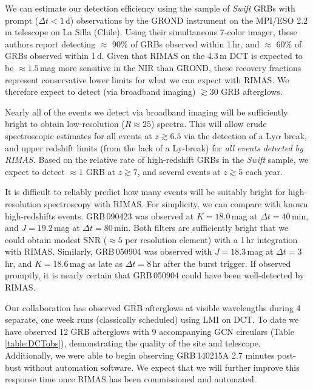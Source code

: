 \documentclass[letterpaper,11pt]{article}
\begin{document}
We can estimate our detection efficiency using the sample of \textit{Swift} 
GRBs with prompt ($\Delta t
< 1$\,d) observations by the GROND instrument on the MPI/ESO 2.2\,m telescope on La Silla 
(Chile)\cite{gkk+11}.  Using their simultaneous 7-color imager, these authors report
detecting $\approx$ 90\% of GRBs observed within 1\,hr, and $\approx$ 60\% of
GRBs observed within 1\,d.  Given that RIMAS on the 4.3\,m DCT is expected to be
$\approx 1.5$\,mag more sensitive in the NIR than GROND, these recovery fractions 
represent conservative lower limits for what we can expect with RIMAS. 
We therefore expect to detect (via broadband imaging) $\gtrsim 30$ GRB afterglows.

Nearly all of the events we detect via broadband imaging will be sufficiently 
bright to obtain low-resolution ($R \approx 25$) spectra.  This will allow crude
spectroscopic estimates for all events at $z \gtrsim 6.5$ via the detection of a
Ly$\alpha$ break, and upper redshift limits (from the lack of a Ly-break)
for \textit{all events detected by RIMAS.}  Based on the relative rate of 
high-redshift GRBs in the \textit{Swift} sample\cite{pcb+09,gkk+11}, we expect 
to detect $\approx 1$ GRB at $z \gtrsim 7$, and several events at $z \gtrsim 5$ 
each year. 

It is difficult to reliably predict how many events will be suitably bright 
for high-resolution spectroscopy with RIMAS.  For simplicity, we can compare with known
high-redshifts events.  GRB\,090423\cite{tfl+09} was observed at $K = 18.0$\,mag at
$\Delta t = 40$\,min, and $J = 19.2$\,mag at $\Delta t = 80$\,min.  Both filters are 
sufficiently bright that we could obtain modest SNR ($\approx 5$ per resolution
element) with a 1\,hr integration with RIMAS.  Similarly, GRB\,050904\cite{hnr+05}
was observed with $J = 18.3$\,mag at $\Delta t = 3$\,hr, and $K = 18.6$\,mag as
late as $\Delta t = 8$\,hr after the burst trigger.  If observed promptly, it is 
nearly certain that GRB\,050904 could have been well-detected by RIMAS.

Our collaboration has observed GRB afterglows at visible wavelengths during 4 separate, 
one week runs (classically scheduled) using LMI on DCT. To date we have observed 12 GRB 
afterglows with 9 accompanying GCN circulars (Table \ref{table:DCTobs}), demonstrating 
the quality of the site and telescope. Additionally, we were able to begin observing 
GRB\,140215A 2.7 minutes post-bust without automation software.  We expect that we will
further improve this response time once RIMAS has been commissioned and automated. \\
\end{document}
